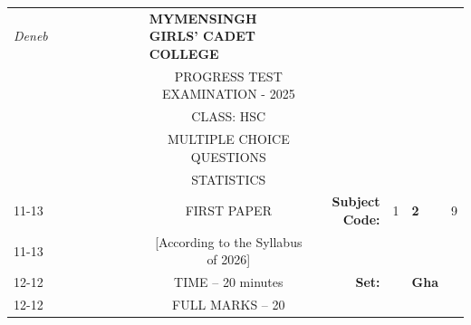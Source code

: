 \documentclass[12pt]{exam}
\begin{document}
\begin{table}[]
\begin{tabular}{llllllllcllll}
\textit{Deneb} &  &  &  &  &  &  &  & \multicolumn{1}{l}{\textbf{MYMENSINGH GIRLS' CADET COLLEGE}} &                                             &                        &                                 &                        \\
                &  &  &  &  &  &  &  & \multicolumn{1}{c}{PROGRESS TEST EXAMINATION - 2025}       &                                             &                        & \multicolumn{1}{c}{}            &                        \\
                &  &  &  &  &  &  &  & CLASS: HSC                                                   &                                             &                        & \multicolumn{1}{c}{}            &                        \\
                &  &  &  &  &  &  &  & MULTIPLE CHOICE QUESTIONS                                    &                                             &                        & \multicolumn{1}{c}{}            &                        \\
                &  &  &  &  &  &  &  & STATISTICS                                                   &                                             &                        & \multicolumn{1}{r}{}            &                        \\ \cline{11-13} 
                &  &  &  &  &  &  &  & FIRST PAPER                                                 & \multicolumn{1}{r|}{\textbf{Subject Code:}} & \multicolumn{1}{l|}{1} & \multicolumn{1}{l|}{\textbf{2}} & \multicolumn{1}{l|}{9} \\ \cline{11-13} 
                &  &  &  &  &  &  &  & [According to the Syllabus of 2026]                          & \multicolumn{1}{r}{}                        &                        &                                 &                        \\ \cline{12-12}
                &  &  &  &  &  &  &  & TIME – 20 minutes                                            & \multicolumn{1}{r}{\textbf{Set:}}           & \multicolumn{1}{l|}{}  & \multicolumn{1}{l|}{\textbf{Gha}} &                        \\ \cline{12-12}
                &  &  &  &  &  &  &  & FULL MARKS – 20                                              &                                             &                        &                                 &                       
\end{tabular}
\end{table}
\end{document}
